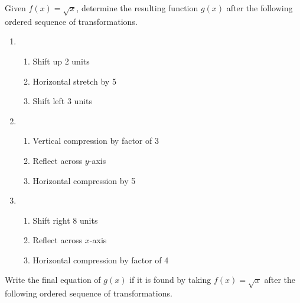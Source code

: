 Given $f(x) = \sqrt{x}$, determine the resulting function $g(x)$ after the following ordered sequence of transformations.
\begin{enumerate}
\setcounter{enumi}{\value{Review}}
\item
\begin{enumerate}[(1)]
\item Shift up 2 units
\item Horizontal stretch by 5
\item Shift left 3 units
\end{enumerate}

\item
\begin{enumerate}[(1)]
\item Vertical compression by factor of 3
\item Reflect across $y$-axis
\item Horizontal compression by 5
\end{enumerate}

\item
\begin{enumerate}[(1)]
\item Shift right 8 units
\item Reflect across $x$-axis
\item Horizontal compression by factor of 4
\end{enumerate}
\setcounter{Review}{\value{enumi}}
\end{enumerate}

\newpage

Write the final equation of $g(x)$ if it is found by taking $f(x) = \sqrt{x}$ after the following ordered sequence of transformations.   

